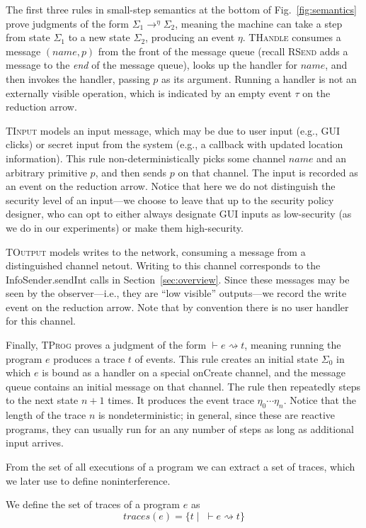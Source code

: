 \documentclass{llncs}
\newcommand{\code}[1]{\textsf{#1}} %
\newcommand{\aset}[1]{\{#1\}}
\newcommand{\sfmt}[1]{\textsf{#1}}
\newcommand{\sch}{\textit{name}}
\newcommand{\treduce}{\rightarrow}
\newcommand{\judge}{\vdash}
\newcommand{\xv}{p}
\newcommand{\traces}{\textit{traces}}
\newcommand{\evt}{\eta}
\begin{document}
The first three rules 
in small-step semantics at the bottom of
Fig.~\ref{fig:semantics} prove judgments of the form
$\Sigma_1 \treduce^{\evt} \Sigma_2$, meaning the machine can take a step from state
$\Sigma_1$ to a new state $\Sigma_2$, producing an event $\evt$.
\textsc{THandle} consumes a message $(\sch, \xv)$ from the front of
the message queue (recall \textsc{RSend} adds a message to the
\emph{end}  of the message queue), looks up the handler for $\sch$,
and then invokes the handler, passing $\xv$ as its argument. Running a
handler is not an externally visible operation, which is indicated by an empty
event $\tau$ on the reduction arrow. 

\textsc{TInput} models an input message, which may be due to user
input (e.g., GUI clicks) or secret input from the system (e.g.,
a callback with updated location information). This rule
non-deterministically picks some channel $\sch$ and an arbitrary
primitive $p$, and then sends $p$ on that channel. 
The input is recorded as an event on the reduction arrow.
Notice that here we do not distinguish the security level of an input---we choose to leave that
up to the security policy designer, who can opt to either always
designate GUI inputs as low-security (as we do in our experiments) or
make them high-security.

\textsc{TOutput} models writes to the network, consuming a message
from a distinguished channel \sfmt{netout}. Writing to this channel
corresponds to the \code{InfoSender.sendInt} calls in
Section~\ref{sec:overview}. Since these messages may be seen by the
observer---i.e., they are ``low visible'' outputs---we record the
write event on the reduction arrow. Note that by convention
there is no user handler for this channel.

Finally, \textsc{TProg} proves a judgment of the form
$\judge e \rightsquigarrow t$, meaning running the program $e$ produces a
trace $t$ of events.
This rule creates an initial state $\Sigma_0$ in
which $e$ is bound as a handler on a special \code{onCreate} channel,
and the message queue contains an initial message on that channel. The
rule then repeatedly steps to the next state $n+1$ times. It produces 
the event trace $\eta_0\cdots\eta_n$.
Notice that the length of the trace $n$ is nondeterministic; in general,
since these are reactive programs, they can usually run for an any
number of steps as long as additional input arrives.

From the set of all executions of a program we can extract a set of
traces, which we later use to define noninterference.
\begin{definition}
  We define the set of traces of a program $e$ as
\begin{displaymath}
  \traces(e) = \aset{t \mid \; \judge e { \rightsquigarrow t }}
\end{displaymath}
\end{definition}
\end{document}
